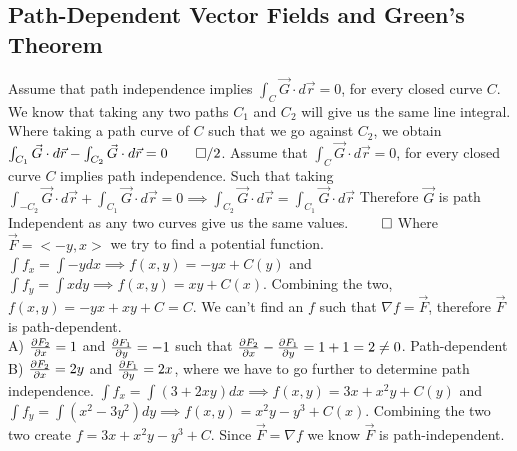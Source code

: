\documentclass{article}
\begin{document}
\subsection{Path-Dependent Vector Fields and Green's Theorem}
\myproof
Assume that path independence implies $\int_C \vec{G} \cdot d \vec{r}=0$, for every closed curve $C$.
We know that taking any two paths $C_1$ and $C_2$ will give us the same line integral.
Where taking a path curve of $C$ such that we go against $C_2$, we obtain $\int_{C_1} \vec{G} \cdot d \vec{r} - \int_{C_2} \vec{G} \cdot d \vec{r} = 0 \qed/2$.
\double
Assume that $\int_C \vec{G} \cdot d \vec{r}=0$, for every closed curve $C$ implies path independence. 
Such that taking $\int_{-C_2} \vec{G} \cdot d \vec{r} + \int_{C_1} \vec{G} \cdot d \vec{r} = 0 \implies \int_{C_2} \vec{G} \cdot d \vec{r} = \int_{C_1} \vec{G} \cdot d \vec{r}$
Therefore $\vec{G}$ is path Independent as any two curves give us the same values. $\qed$
\sol Where $\vec{F} = <-y,x>$ we try to find a potential function. $\int f_x =\int -y dx \implies f(x,y) = -yx +C(y)$ and $\int f_y = \int x dy \implies f(x,y) = xy + C(x)$.
Combining the two, $f(x,y) = -yx + xy + C = C$. We can't find an $f$ such that $\nabla f = \vec{F}$, therefore $\vec{F}$ is path-dependent.
\sol \\
A) $\frac{\partial F_2}{\partial x} = 1$ and $\frac{\partial F_1}{\partial y} = -1$ such that $\frac{\partial F_2}{\partial x} - \frac{\partial F_1}{\partial y} = 1 + 1 = 2 \ne 0$. Path-dependent \\
B) $\frac{\partial F_2}{\partial x} = 2y$ and $\frac{\partial F_1}{\partial y} = 2x$, where we have to go further to determine path independence.
$\int f_x = \int (3+2xy) dx \implies f(x,y) = 3x+x^2 y + C(y)$ and $\int f_y = \int (x^2-3y^2) dy \implies f(x,y) = x^2 y -y^3 + C(x)$.
Combining the two two create $f = 3x+x^2 y - y^3 + C$. Since $\vec{F} = \nabla f$ we know $\vec{F}$ is path-independent.
\end{document}
